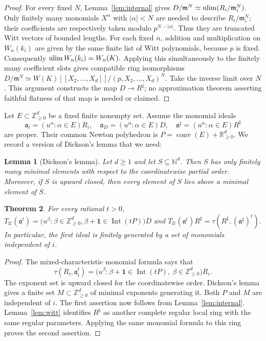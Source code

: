 \documentclass[11pt,a4paper]{amsart}
\numberwithin{equation}{section}
\newtheorem{theorem}{Theorem}[section]
\newtheorem{lemma}[theorem]{Lemma}
\newcommand{\U}{\mathcal{U}}
\newcommand{\mm}{\mathfrak m}
\newcommand{\ideal}{\mathfrak a}
\newcommand{\NN}{\mathbb Z_{\geq0}}
\newcommand{\one}{\mathbf 1}
\DeclareMathOperator{\Int}{Int}
\DeclareMathOperator{\conv}{conv}
\begin{document}
 \begin{proof}
 	For every fixed $N$, Lemma~\ref{lem:internal} gives
 $D/\mm^N\simeq\ulim(R_i/\mm_i^N).$
 	Only finitely many monomials $X^\alpha$ with $|\alpha|<N$
 	are needed to describe $R_i/\mm_i^N$; their coefficients are
 	respectively taken modulo $p^{N-|\alpha|}$. Thus they are
 	truncated Witt vectors of bounded lengths.
For each fixed $n$, addition and multiplication on $W_n(k_i)$
 	are given by the same finite list of Witt polynomials, because
 	$p$ is fixed. Consequently
 $\operatorname*{ulim} W_n(k_i)=W_n(K).$
 	Applying this simultaneously to the finitely many coefficient
 	slots gives compatible ring isomorphisms
 	$D/\mm^N\simeq
 	W(K)[[X_2,\ldots,X_d]]/(p,X_2,\ldots,X_d)^N.$
 	Take the inverse limit over $N$. This argument constructs the
 	map $D\to R^\sharp$; no approximation theorem asserting faithful
 	flatness of that map is needed or claimed.
 \end{proof}
 
 Let $E\subset\NN^d$ be a fixed finite nonempty set. Assume the
 monomial ideals
 $$\ideal_i=(u^\alpha:\alpha\in E)R_i,
 \quad \ideal_D=(u^\alpha:\alpha\in E)D,
 \quad \ideal^\sharp=(u^\alpha:\alpha\in E)R^\sharp$$
 are proper. Their common Newton polyhedron is
$ P=\conv(E)+\mathbb R_{\geq0}^{d}.$
 We record a version of Dickson's lemma that we need:
 \begin{lemma}[Dickson's lemma]
 	Let $d\geq 1$ and let $S\subseteq\mathbb{N}^d$.
 	Then $S$ has only finitely many minimal elements with respect
 	to the coordinatewise partial order. Moreover, if $S$ is upward
 	closed, then every element of $S$ lies above a minimal element
 	of $S$.
 \end{lemma}
 
 
 \begin{theorem}\label{thm:monomial}
 	For every   rational $t>0$,  
 $T_{\U}(\ideal^t) =\bigl(u^\beta:\beta\in\NN^d,
 \beta+\one\in\Int(tP)\bigr)D$ and 
$T_{\U}(\ideal^t)R^\sharp=\tau(R^\sharp,(\ideal^\sharp)^t).$
 	In particular, the first ideal is finitely generated by a set of  monomials independent of $i$.
 \end{theorem}
 
 \begin{proof}
 	The mixed-characteristic monomial formula
 	\cite[Proposition 8.21]{BMP} says that
 	$$
 	\tau(R_i,\ideal_i^t)
 	=\bigl(u^\beta:\beta+\one\in\Int(tP),\ \beta\in\NN^d\bigr)R_i.
 	$$
 	The exponent set is upward closed for the coordinatewise order.
 	Dickson's lemma gives a finite set $M\subset\NN^d$ of minimal
 	exponents generating it. Both $P$ and $M$ are independent of $i$.
 	The first assertion now follows from Lemma~\ref{lem:internal}.
 	Lemma~\ref{lem:witt} identifies $R^\sharp$ as another complete
 	regular local ring with the same regular parameters. Applying
 	the same monomial formula to this ring proves the second
 	assertion.
 \end{proof}
 
\end{document}

